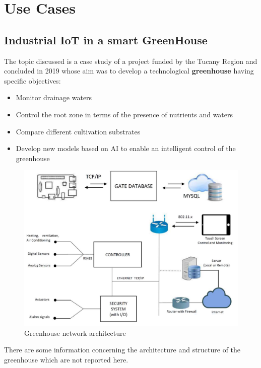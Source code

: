 \chapter{Use Cases}
\section{Industrial IoT in a smart GreenHouse}
The topic discussed is a case study of a project funded by the Tucany Region and concluded in 2019 whose aim was to develop a technological \textbf{greenhouse} having specific objectives:
\begin{itemize}
   \item Monitor drainage waters
   \item Control the root zone in terms of the presence of nutrients and waters
   \item Compare different cultivation substrates
   \item Develop new models based on AI to enable an intelligent control of the greenhouse
\end{itemize}


\begin{figure}[htbp]
   \centering
   \includegraphics{images/greenhouse_tcp_architecture.png}
   \caption{Greenhouse network architecture}
   \label{fig:greenhouse_tcp_architecture}
\end{figure}
There are some information concerning the architecture and structure of the greenhouse which are not reported here.

